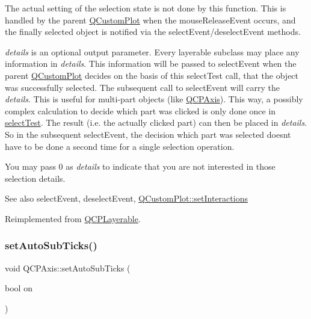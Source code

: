 The actual setting of the selection state is not done by this function. This is handled by the parent \mbox{\hyperlink{class_q_custom_plot}{Q\+Custom\+Plot}} when the mouse\+Release\+Event occurs, and the finally selected object is notified via the select\+Event/deselect\+Event methods.

{\itshape details} is an optional output parameter. Every layerable subclass may place any information in {\itshape details}. This information will be passed to select\+Event when the parent \mbox{\hyperlink{class_q_custom_plot}{Q\+Custom\+Plot}} decides on the basis of this select\+Test call, that the object was successfully selected. The subsequent call to select\+Event will carry the {\itshape details}. This is useful for multi-\/part objects (like \mbox{\hyperlink{class_q_c_p_axis}{Q\+C\+P\+Axis}}). This way, a possibly complex calculation to decide which part was clicked is only done once in \mbox{\hyperlink{class_q_c_p_axis_a48e4f1bafd1826ba2ad46b691205bb90}{select\+Test}}. The result (i.\+e. the actually clicked part) can then be placed in {\itshape details}. So in the subsequent select\+Event, the decision which part was selected doesn\textquotesingle{}t have to be done a second time for a single selection operation.

You may pass 0 as {\itshape details} to indicate that you are not interested in those selection details.

\begin{DoxySeeAlso}{See also}
select\+Event, deselect\+Event, \mbox{\hyperlink{class_q_custom_plot_a5ee1e2f6ae27419deca53e75907c27e5}{Q\+Custom\+Plot\+::set\+Interactions}} 
\end{DoxySeeAlso}


Reimplemented from \mbox{\hyperlink{class_q_c_p_layerable_a04db8351fefd44cfdb77958e75c6288e}{Q\+C\+P\+Layerable}}.

\mbox{\label{class_q_c_p_axis_adcbdec7a60054b88571e89599f4a45bf}} 
\subsubsection{\texorpdfstring{set\+Auto\+Sub\+Ticks()}{setAutoSubTicks()}}
{\footnotesize\ttfamily void Q\+C\+P\+Axis\+::set\+Auto\+Sub\+Ticks (\begin{DoxyParamCaption}\item[{bool}]{on }\end{DoxyParamCaption})}

